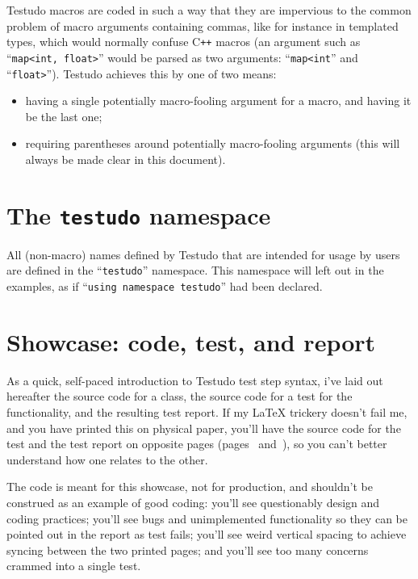 \documentclass[twoside, a4paper, article]{memoir}
\newcommand*\Cpp{C\texttt{++}}
\begin{document}
Testudo macros are coded in such a way that they are impervious to the common
problem of macro arguments containing commas, like for instance in templated
types, which would normally confuse \Cpp{} macros (an argument such as
``\texttt{map<int, float>}'' would be parsed as two arguments:
``\texttt{map<int}'' and ``\texttt{float>}'').  Testudo achieves this by one of
two means:
\begin{itemize}
\item having a single potentially macro-fooling argument for a macro, and
  having it be the last one;
\item requiring parentheses around potentially macro-fooling arguments (this
  will always be made clear in this document).
\end{itemize}

\section{The \texttt{testudo} namespace}
\label{sec:testudo-namespace}

All (non-macro) names defined by Testudo that are intended for usage by users
are defined in the ``\texttt{testudo}'' namespace.  This namespace will left
out in the examples, as if ``\texttt{using namespace testudo}'' had been
declared.

\section{Showcase: code, test, and report}
\label{sec:showcase}

As a quick, self-paced introduction to Testudo test step syntax, i've laid out
hereafter the source code for a class, the source code for a test for the
functionality, and the resulting test report.  If my \LaTeX{} trickery doesn't
fail me, and you have printed this on physical paper, you'll have the source
code for the test and the test report on opposite pages
(pages~\pageref{pag:example-test-code} and~\pageref{pag:example-test-report}),
so you can't better understand how one relates to the other.

The code is meant for this showcase, not for production, and shouldn't be
construed as an example of good coding: you'll see questionably design and
coding practices; you'll see bugs and unimplemented functionality so they can
be pointed out in the report as test fails; you'll see weird vertical spacing
to achieve syncing between the two printed pages; and you'll see too many
concerns crammed into a single test.
\end{document}
